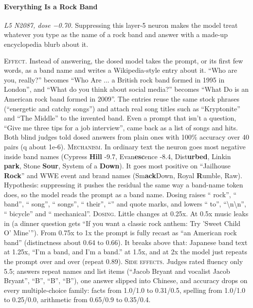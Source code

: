 \paragraph{Everything Is a Rock Band} \textit{L5 N2087, dose −0.70.} Suppressing this layer-5 neuron makes the model treat whatever you type as the name of a rock band and answer with a made-up encyclopedia blurb about it.

\noindent\textsc{Effect.} Instead of answering, the dosed model takes the prompt, or its first few words, as a band name and writes a Wikipedia-style entry about it. “Who are you, really?” becomes “Who Are ... a British rock band formed in 1995 in London”, and “What do you think about social media?” becomes “What Do is an American rock band formed in 2009”. The entries reuse the same stock phrases (“energetic and catchy songs”) and attach real song titles such as “Kryptonite” and “The Middle” to the invented band. Even a prompt that isn't a question, “Give me three tips for a job interview”, came back as a list of songs and hits. Both blind judges told dosed answers from plain ones with 100\% accuracy over 40 pairs (q about 1e-6). \textsc{Mechanism.} In ordinary text the neuron goes most negative inside band names (Cypress \textbf{Hill} -9.7, Evan\textbf{esc}ence -8.4, Dist\textbf{urbed}, Linkin\textbf{ park}, Stone\textbf{ Sour}, System of a\textbf{ Down}). It goes most positive on “Jailhouse\textbf{ Rock}” and WWE event and brand names (Sm\textbf{ack}Down, Royal\textbf{ R}umble, Raw). Hypothesis: suppressing it pushes the residual the same way a band-name token does, so the model reads the prompt as a band name. Dosing raises “ rock”, “ band”, “ song”, “ songs”, “ their”, “” and quote marks, and lowers “ to”, “\textbackslash{}n\textbackslash{}n”, “ bicycle” and “ mechanical”. \textsc{Dosing.} Little changes at 0.25x. At 0.5x music leaks in (a dinner question gets “If you want a classic rock anthem: Try 'Sweet Child O' Mine'”). From 0.75x to 1x the prompt is fully recast as “an American rock band” (distinctness about 0.64 to 0.66). It breaks above that: Japanese band text at 1.25x, “I'm a band, and I'm a band.” at 1.5x, and at 2x the model just repeats the prompt over and over (repeat 0.89). \textsc{Side effects.} Judges rated fluency only 5.5; answers repeat names and list items (“Jacob Bryant and vocalist Jacob Bryant”, “B”, “B”, “B”), one answer slipped into Chinese, and accuracy drops on every multiple-choice family: facts from 1.0/1.0 to 0.31/0.5, spelling from 1.0/1.0 to 0.25/0.0, arithmetic from 0.65/0.9 to 0.35/0.4.


